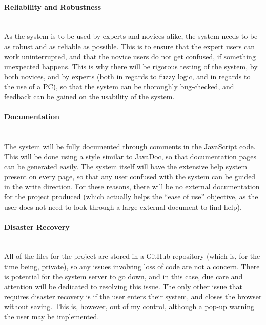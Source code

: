\paragraph{Reliability and Robustness}\ \\
As the system is to be used by experts and novices alike, the system needs to be as robust and as reliable as possible. This is to ensure that the expert users can work uninterrupted, and that the novice users do not get confused, if something unexpected happens. This is why there will be rigorous testing of the system, by both novices, and by experts (both in regards to fuzzy logic, and in regards to the use of a PC), so that the system can be thoroughly bug-checked, and feedback can be gained on the usability of the system.

\paragraph{Documentation}\ \\
The system will be fully documented through comments in the JavaScript code. This will be done using a style similar to JavaDoc, so that documentation pages can be generated easily. The system itself will have the extensive help system present on every page, so that any user confused with the system can be guided in the write direction. For these reasons, there will be no external documentation for the project produced (which actually helps the ``ease of use'' objective, as the user does not need to look through a large external document to find help).

\paragraph{Disaster Recovery}\ \\
All of the files for the project are stored in a GitHub repository (which is, for the time being, private), so any issues involving loss of code are not a concern. There is potential for the system server to go down, and in this case, due care and attention will be dedicated to resolving this issue. The only other issue that requires disaster recovery is if the user enters their system, and closes the browser without saving. This is, however, out of my control, although a pop-up warning the user may be implemented.